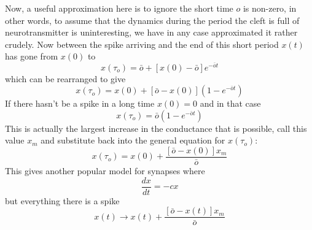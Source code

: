 \documentclass[11pt,a4paper]{scrartcl}
\begin{document}
Now, a useful approximation here is to ignore the short time $o$ is
non-zero, in other words, to assume that the dynamics during the
period the cleft is full of neurotransmitter is uninteresting, we have
in any case approximated it rather crudely. Now between the spike
arriving and the end of this short period $x(t)$ has gone from $x(0)$ to
\begin{equation}
x(\tau_o)=\bar{o}+[x(0)-\bar{o}]e^{-\bar{o}t}
\end{equation}
which can be rearranged to give
\begin{equation}
x(\tau_o)=x(0)+[\bar{o}-x(0)]\left(1-e^{-\bar{o}t}\right)
\end{equation}
If there hasn't be a spike in a long time $x(0)=0$ and in that case
\begin{equation}
x(\tau_o)=\bar{o}\left(1-e^{-\bar{o}t}\right)
\end{equation}
This is actually the largest increase in the conductance that is
possible, call this value $x_m$ and substitute back into the general
equation for $x(\tau_o)$:
\begin{equation}
x(\tau_o)=x(0)+\frac{[\bar{o}-x(0)]x_m}{\bar{o}}
\end{equation}
This gives another popular model for synapses where 
\begin{equation}
\frac{dx}{dt}=-cx
\end{equation}
but everything there is a spike
\begin{equation}
x(t)\rightarrow x(t)+\frac{[\bar{o}-x(t)]x_m}{\bar{o}}
\end{equation}
\end{document}
